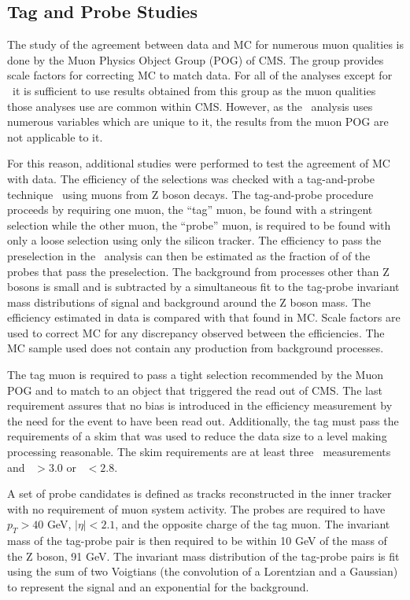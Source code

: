 \subsection{Tag and Probe Studies \label{sec:TagProbe}}
The study of the agreement between data and MC for numerous muon qualities is done by the Muon Physics Object Group (POG) of CMS.
The group provides scale factors for correcting MC to match data.
For all of the analyses except for \muononly\  it is sufficient to use results obtained from this group as the muon qualities
those analyses use are common within CMS.
However, as the \muononly\ analysis uses numerous variables which are unique to it, the results from the muon POG are not applicable to it.

For this reason, additional studies were performed to test the agreement of MC with data.
The efficiency of the selections was checked with a tag-and-probe technique~\cite{2012JInst...7P0002T} using muons from Z boson decays.
The tag-and-probe procedure proceeds by requiring one muon, the ``tag'' muon, be found with a stringent selection while the other muon, the ``probe'' muon,
is required to be found with only a loose selection using only the silicon tracker. The efficiency to pass the preselection in the \muononly\ analysis
can then be estimated as the fraction of of the probes that pass the preselection. The background from processes other than Z bosons is small and is subtracted by
a simultaneous fit to the tag-probe invariant mass distributions of signal and background around the Z boson mass.
The efficiency estimated in data is compared with that found in MC. Scale factors are used to correct MC for any discrepancy observed between the efficiencies.
The MC sample used does not contain any production from background processes.

The tag muon is required to pass a tight selection recommended by the Muon POG and to match to an object that triggered the read out of CMS. 
The last requirement assures that no bias is introduced in the efficiency measurement by the need for the event to have been read out.
Additionally, the tag must pass the requirements of a skim that was used to reduce the data size to a level
making processing reasonable. The skim requirements are at least three \dedx\ measurements and \ih\ $> 3.0$ or \ih\ $< 2.8$.

A set of probe candidates is defined as tracks reconstructed in the inner tracker with no requirement
of muon system activity. The probes are required to have $p_T > 40$ GeV, $|\eta| < 2.1$, and the opposite charge of the tag muon.
The invariant mass of the tag-probe pair is then required to be within 10 GeV of the mass of the Z boson, 91 GeV.
The invariant mass distribution of the tag-probe pairs is fit using the
sum of two Voigtians (the convolution of a Lorentzian and a Gaussian) to represent the signal and an exponential for the background.

